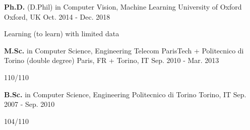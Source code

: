 

\begin{cventries}

  \cventry
    {\textbf{Ph.D.} (D.Phil) in Computer Vision, Machine Learning} %
    {University of Oxford} %
    {Oxford, UK} %
    {Oct. 2014 - Dec. 2018} %
    {
      \begin{cvitems} %
	  \item {Learning (to learn) with limited data}
      \end{cvitems}
    }

  \cventry
    {\textbf{M.Sc.} in Computer Science, Engineering} %
    {Telecom ParisTech + Politecnico di Torino (double degree)} %
    {Paris, FR + Torino, IT} %
    {Sep. 2010 - Mar. 2013} %
    {
      \begin{cvitems} %
        \item {110/110}
      \end{cvitems}
    }

  \cventry
    {\textbf{B.Sc.} in Computer Science, Engineering} %
    {Politecnico di Torino} %
    {Torino, IT} %
    {Sep. 2007 - Sep. 2010} %
    {
      \begin{cvitems} %
        \item {104/110}
      \end{cvitems}
    }  
\end{cventries}
